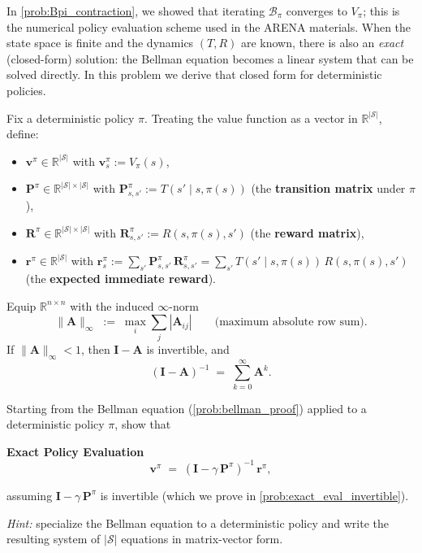\documentclass[11pt]{article}
\newcommand{\cS}{\mathcal{S}}
\begin{document}
In \cref{prob:Bpi_contraction}, we showed that iterating $\mathcal{B}_\pi$ converges to $V_\pi$; this is the numerical policy evaluation scheme used in the ARENA materials. When the state space is finite and the dynamics $(T, R)$ are known, there is also an \emph{exact} (closed-form) solution: the Bellman equation becomes a linear system that can be solved directly. In this problem we derive that closed form for deterministic policies.

\begin{definition}\label{def:matrix_notation}
Fix a deterministic policy $\pi$. Treating the value function as a vector in $\mathbb{R}^{|\cS|}$, define:
\begin{itemize}\itemsep=2pt
  \item $\mathbf{v}^\pi \in \mathbb{R}^{|\cS|}$ with $\mathbf{v}^\pi_s := V_\pi(s)$,
  \item $\mathbf{P}^\pi \in \mathbb{R}^{|\cS| \times |\cS|}$ with $\mathbf{P}^\pi_{s,s'} := T(s' \mid s, \pi(s))$ (the \textbf{transition matrix} under $\pi$),
  \item $\mathbf{R}^\pi \in \mathbb{R}^{|\cS| \times |\cS|}$ with $\mathbf{R}^\pi_{s,s'} := R(s, \pi(s), s')$ (the \textbf{reward matrix}),
  \item $\mathbf{r}^\pi \in \mathbb{R}^{|\cS|}$ with $\mathbf{r}^\pi_s := \sum_{s'} \mathbf{P}^\pi_{s,s'}\, \mathbf{R}^\pi_{s,s'} = \sum_{s'} T(s' \mid s, \pi(s))\, R(s, \pi(s), s')$ (the \textbf{expected immediate reward}).
\end{itemize}
\end{definition}

\begin{fact}\label{fact:neumann}
Equip $\mathbb{R}^{n \times n}$ with the induced $\infty$-norm
$$\|\mathbf{A}\|_\infty \;:=\; \max_i \sum_j |\mathbf{A}_{ij}| \qquad \text{(maximum absolute row sum).}$$
If $\|\mathbf{A}\|_\infty < 1$, then $\mathbf{I} - \mathbf{A}$ is invertible, and
$$(\mathbf{I} - \mathbf{A})^{-1} \;=\; \sum_{k=0}^{\infty} \mathbf{A}^k.$$
\end{fact}

\begin{exercise}
\label{prob:exact_eval_derive} Starting from the Bellman equation (\cref{prob:bellman_proof}) applied to a deterministic policy $\pi$, show that
\begin{callout}[note]
\textbf{Exact Policy Evaluation}
$$
\mathbf{v}^\pi \;=\; (\mathbf{I} - \gamma\, \mathbf{P}^\pi)^{-1}\, \mathbf{r}^\pi,
$$
\end{callout}
assuming $\mathbf{I} - \gamma\, \mathbf{P}^\pi$ is invertible (which we prove in \cref{prob:exact_eval_invertible}).

\textit{Hint:} specialize the Bellman equation to a deterministic policy and write the resulting system of $|\cS|$ equations in matrix-vector form.
\end{exercise}
\end{document}
